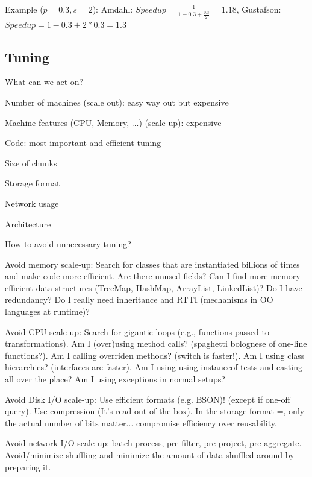 \documentclass[11pt,oneside,a4paper]{article}
\begin{document}
{Example ($p=0.3, s=2$): Amdahl: $Speedup = \frac{1}{1-0.3+\frac{0.3}{2}} = 1.18$, Gustafson: $Speedup = 1-0.3+2*0.3 = 1.3$


\subsection{Tuning}

What can we act on?

\begin{compactitem}
\item Number of machines (scale out): easy way out but expensive
\item Machine features (CPU, Memory, ...) (scale up): expensive
\item Code: most important and efficient tuning
\item Size of chunks
\item Storage format
\item Network usage
\item Architecture
\end{compactitem}

How to avoid unnecessary tuning?

\begin{compactitem}
\item Avoid memory scale-up: Search for classes that are instantiated billions of times and make code more efficient. Are there unused fields? Can I find more memory-efficient data structures (TreeMap, HashMap, ArrayList, LinkedList)? Do I have redundancy? Do I really need inheritance and RTTI (mechanisms in OO languages at runtime)? 
\item Avoid CPU scale-up: Search for gigantic loops (e.g., functions passed to transformations). Am I (over)using method calls? (spaghetti bolognese of one-line functions?). Am I calling overriden methods? (switch is faster!). Am I using class hierarchies? (interfaces are faster). Am I using using instanceof tests and casting all over the place? Am I using exceptions in normal setups?
\item Avoid Disk I/O scale-up: Use efficient formats (e.g. BSON)! (except if one-off query). Use compression (It's read out of the box). In the storage format =, only the actual number of bits matter... compromise efficiency over reusability.
\item Avoid network I/O scale-up: batch process, pre-filter, pre-project, pre-aggregate. Avoid/minimize shuffling and minimize the amount of data shuffled around by preparing it.
\end{compactitem}


}
\end{document}
